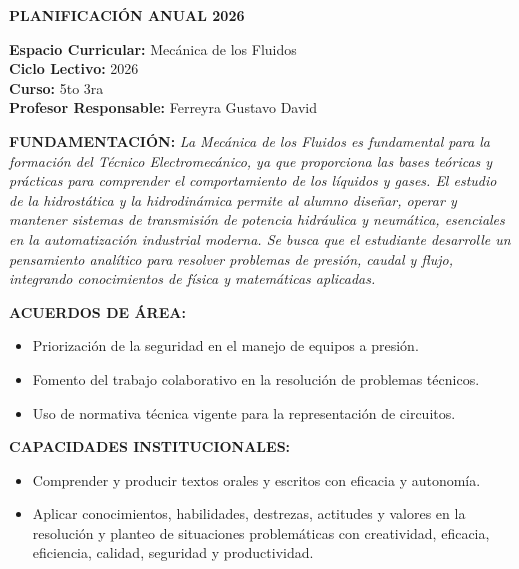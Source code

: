 \documentclass[11pt, a4paper]{article}
\begin{document}
\noindent\colorbox{schoolgreen}{\begin{minipage}{\dimexpr\textwidth-2\fboxsep}\centering \textbf{\fontsize{14}{16}\selectfont PLANIFICACIÓN ANUAL 2026}\end{minipage}}

\vspace{1em}
\begin{flushleft}
\textbf{Espacio Curricular:} Mecánica de los Fluidos \\
\textbf{Ciclo Lectivo:} 2026 \\
\textbf{Curso:} 5to 3ra \\
\textbf{Profesor Responsable:} Ferreyra Gustavo David
\end{flushleft}

\vspace{1em}
\noindent \textbf{FUNDAMENTACIÓN:}
\textit{La Mecánica de los Fluidos es fundamental para la formación del Técnico Electromecánico, ya que proporciona las bases teóricas y prácticas para comprender el comportamiento de los líquidos y gases. El estudio de la hidrostática y la hidrodinámica permite al alumno diseñar, operar y mantener sistemas de transmisión de potencia hidráulica y neumática, esenciales en la automatización industrial moderna. Se busca que el estudiante desarrolle un pensamiento analítico para resolver problemas de presión, caudal y flujo, integrando conocimientos de física y matemáticas aplicadas.}

\vspace{1em}
\noindent \textbf{ACUERDOS DE ÁREA:}
\begin{itemize}
\item Priorización de la seguridad en el manejo de equipos a presión.
\item Fomento del trabajo colaborativo en la resolución de problemas técnicos.
\item Uso de normativa técnica vigente para la representación de circuitos.
\end{itemize}

\vspace{1em}
\noindent \textbf{CAPACIDADES INSTITUCIONALES:}
\begin{itemize}
\item Comprender y producir textos orales y escritos con eficacia y autonomía.
\item Aplicar conocimientos, habilidades, destrezas, actitudes y valores en la resolución y planteo de situaciones problemáticas con creatividad, eficacia, eficiencia, calidad, seguridad y productividad.
\end{itemize}
\end{document}
